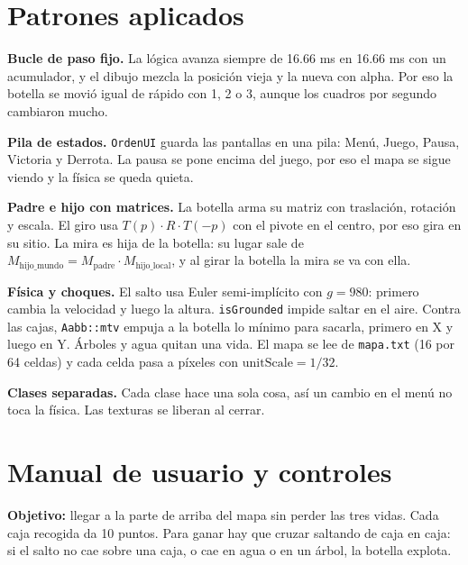 \documentclass[12pt, a4paper]{article}
\begin{document}
\section*{Patrones aplicados}

\textbf{Bucle de paso fijo.} La lógica avanza siempre de 16.66 ms en 16.66 ms con un acumulador, y el dibujo mezcla la posición vieja y la nueva con alpha. Por eso la botella se movió igual de rápido con 1, 2 o 3, aunque los cuadros por segundo cambiaron mucho.

\textbf{Pila de estados.} \texttt{OrdenUI} guarda las pantallas en una pila: Menú, Juego, Pausa, Victoria y Derrota. La pausa se pone encima del juego, por eso el mapa se sigue viendo y la física se queda quieta.

\textbf{Padre e hijo con matrices.} La botella arma su matriz con traslación, rotación y escala. El giro usa $T(p)\cdot R\cdot T(-p)$ con el pivote en el centro, por eso gira en su sitio. La mira es hija de la botella: su lugar sale de $M_{\mathrm{hijo\_mundo}} = M_{\mathrm{padre}}\cdot M_{\mathrm{hijo\_local}}$, y al girar la botella la mira se va con ella.

\textbf{Física y choques.} El salto usa Euler semi-implícito con $g = 980$: primero cambia la velocidad y luego la altura. \texttt{isGrounded} impide saltar en el aire. Contra las cajas, \texttt{Aabb::mtv} empuja a la botella lo mínimo para sacarla, primero en X y luego en Y. Árboles y agua quitan una vida. El mapa se lee de \texttt{mapa.txt} (16 por 64 celdas) y cada celda pasa a píxeles con $\mathrm{unitScale} = 1/32$.

\textbf{Clases separadas.} Cada clase hace una sola cosa, así un cambio en el menú no toca la física. Las texturas se liberan al cerrar.

\section*{Manual de usuario y controles}

\textbf{Objetivo:} llegar a la parte de arriba del mapa sin perder las tres vidas. Cada caja recogida da 10 puntos. Para ganar hay que cruzar saltando de caja en caja: si el salto no cae sobre una caja, o cae en agua o en un árbol, la botella explota.
\end{document}
